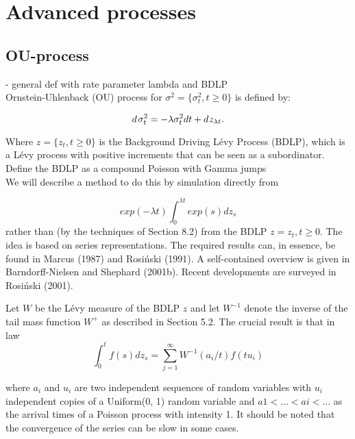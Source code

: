 
\section{Advanced processes}

\subsection{OU-process}
- general def with rate parameter lambda and BDLP\\


Ornstein-Uhlenback (OU) process for $\sigma^2=\{\sigma_{t}^2,t\geq 0\}$ is defined by:

\begin{equation}
    d\hspace{0.1em}\sigma_{t}^2=-\lambda \sigma_{t}^2dt + d\hspace{0.05em} z_{\lambda t}.
    \label{eq:OU-BNS}
\end{equation}

Where $z=\{z_t,t\geq 0\}$ is the Background Driving Lévy Process (BDLP), which is a Lévy process with positive increments that can be seen as a subordinator.\\

Define the BDLP as a compound Poisson with Gamma jumps\\



We will describe a method to do this by simulation directly from

\begin{equation}
exp(-\lambda t)  \int_{0}^{\lambda t} exp(s) dz_s
\end{equation} 
rather than (by the techniques of Section 8.2) from the BDLP $z = z_t, t\geq0$. The idea is based on series representations. The required results can, in essence, be found in Marcus (1987) and Rosi\'{n}ski (1991). A self-contained overview is given in Barndorff-Nielsen and Shephard (2001b). Recent developments are surveyed in Rosi\'{n}ski (2001).

Let $W$ be the L\'{e}vy measure of the BDLP $z$ and let $W^{-1}$ denote the inverse of the tail mass function $W^{+}$ as described in Section 5.2. The crucial result is that in law
\begin{equation}
\int_{0}^{t} f(s) dz_s = \sum_{j=1}^{\infty} W^{-1}(a_i/t) f(tu_i)
\end{equation} 

where {$a_i$} and {$u_i$} are two independent sequences of random variables with $u_i$ independent copies of a Uniform(0, 1) random variable and $a1 < \ldots < ai < \ldots$ as the arrival times of a Poisson process with intensity 1.
It should be noted that the convergence of the series can be slow in some cases.\\

